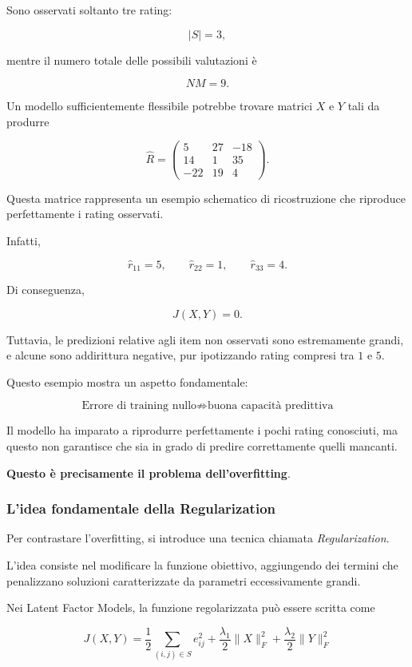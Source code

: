 Sono osservati soltanto tre rating:

\[
|S|=3,
\]

mentre il numero totale delle possibili valutazioni è

\[
NM=9.
\]

Un modello sufficientemente flessibile potrebbe trovare
matrici $X$ e $Y$ tali da produrre

\[
\widehat R=
\begin{pmatrix}
5 & 27 & -18\\
14 & 1 & 35\\
-22 & 19 & 4
\end{pmatrix}.
\]

Questa matrice rappresenta un esempio schematico
di ricostruzione che riproduce perfettamente
i rating osservati.

Infatti,

\[
\widehat r_{11}=5,
\qquad
\widehat r_{22}=1,
\qquad
\widehat r_{33}=4.
\]

Di conseguenza,

\[
J(X,Y)=0.
\]

Tuttavia, le predizioni relative agli item non osservati
sono estremamente grandi, e alcune sono addirittura
negative, pur ipotizzando rating compresi tra $1$ e $5$.

Questo esempio mostra un aspetto fondamentale:

\[
\boxed{
\text{Errore di training nullo}
\not\Rightarrow
\text{buona capacità predittiva}
}
\]

Il modello ha imparato a riprodurre perfettamente i pochi
rating conosciuti, ma questo non garantisce che sia
in grado di predire correttamente quelli mancanti.

\textbf{Questo è precisamente il problema dell'overfitting}.

\subsubsection{L'idea fondamentale della Regularization}

Per contrastare l'overfitting, si introduce una tecnica
chiamata \emph{Regularization}.

L'idea consiste nel modificare la funzione obiettivo,
aggiungendo dei termini che penalizzano soluzioni
caratterizzate da parametri eccessivamente grandi.

Nei Latent Factor Models, la funzione regolarizzata
può essere scritta come

\[
\boxed{
J(X,Y)
=
\frac{1}{2}
\sum_{(i,j)\in S}e_{ij}^{2}
+
\frac{\lambda_1}{2}\|X\|_F^2
+
\frac{\lambda_2}{2}\|Y\|_F^2
}
\]

